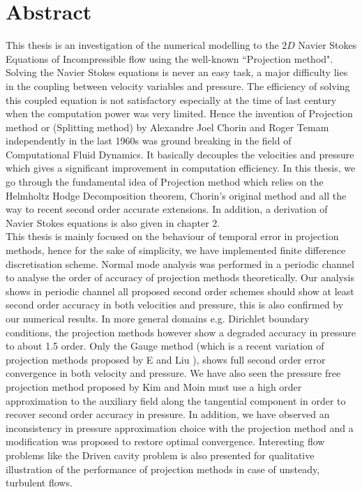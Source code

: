 \chapter*{Abstract}\label{abstract}




This thesis is an investigation of the numerical modelling to the $2D$ Navier Stokes Equations of Incompressible flow using the well-known ``Projection method". Solving the Navier Stokes equations is never an easy task, a major difficulty lies in the coupling between velocity variables and pressure. The efficiency of solving this coupled equation is not satisfactory especially at the time of last century when the computation power was very limited. Hence the invention of Projection method or (Splitting method) by Alexandre Joel Chorin and Roger Temam independently in the last 1960s was ground breaking in the field of Computational Fluid Dynamics. It basically decouples the velocities and pressure which gives a significant improvement in computation efficiency. In this thesis, we go through the fundamental idea of Projection method which relies on the Helmholtz Hodge Decomposition theorem, Chorin's original method and all the way to recent second order accurate extensions. In addition, a derivation of Navier Stokes equations is also given in chapter 2.\\

This thesis is mainly focused on the behaviour of temporal error in projection methods, hence for the sake of simplicity, we have implemented finite difference discretisation scheme. Normal mode analysis was performed in a periodic channel to analyse the order of accuracy of projection methods theoretically. Our analysis shows in periodic channel all proposed second order schemes should show at least second order accuracy in both velocities and pressure, this is also confirmed by our numerical results. In more general domains e.g. Dirichlet boundary conditions, the projection methods however show a degraded accuracy in pressure to about 1.5 order. Only the Gauge method (which is a recent variation of projection methods proposed by E and Liu \cite{weinan2003gauge,brown2001accurate,guermond2006overview}), shows full second order error convergence in both velocity and pressure. We have also seen the pressure free projection method proposed by Kim and Moin must use a high order approximation to the auxiliary field along the tangential component in order to recover second order accuracy in pressure. In addition, we have observed an inconsistency in pressure approximation choice with the projection method and a modification was proposed to restore optimal convergence. Interesting flow problems like the Driven cavity problem is also presented for qualitative illustration of the performance of projection methods in case of unsteady, turbulent flows.
